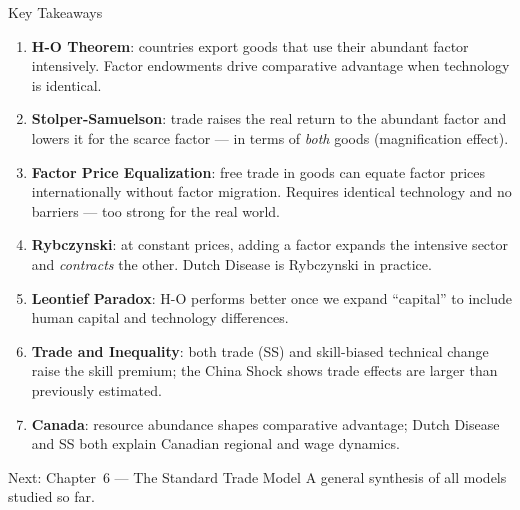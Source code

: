 \documentclass[aspectratio=169]{beamer}
\begin{document}
\begin{frame}[shrink=5]{Key Takeaways}
\begin{enumerate}\small
  \item \textbf{H-O Theorem}: countries export goods that use
        their abundant factor intensively. Factor endowments
        drive comparative advantage when technology is
        identical.
  \item \textbf{Stolper-Samuelson}: trade raises the real
        return to the abundant factor and lowers it for
        the scarce factor --- in terms of \emph{both} goods
        (magnification effect).
  \item \textbf{Factor Price Equalization}: free trade in
        goods can equate factor prices internationally without
        factor migration. Requires identical technology and
        no barriers --- too strong for the real world.
  \item \textbf{Rybczynski}: at constant prices, adding a factor
        expands the intensive sector and \emph{contracts} the
        other. Dutch Disease is Rybczynski in practice.
  \item \textbf{Leontief Paradox}: H-O performs better once
        we expand ``capital'' to include human capital and
        technology differences.
  \item \textbf{Trade and Inequality}: both trade (SS) and
        skill-biased technical change raise the skill premium;
        the China Shock shows trade effects are larger than
        previously estimated.
  \item \textbf{Canada}: resource abundance shapes comparative
        advantage; Dutch Disease and SS both explain Canadian
        regional and wage dynamics.
\end{enumerate}
\begin{block}{Next: Chapter~6 --- The Standard Trade Model}
A general synthesis of all models studied so far.
\end{block}
\end{frame}
\end{document}
